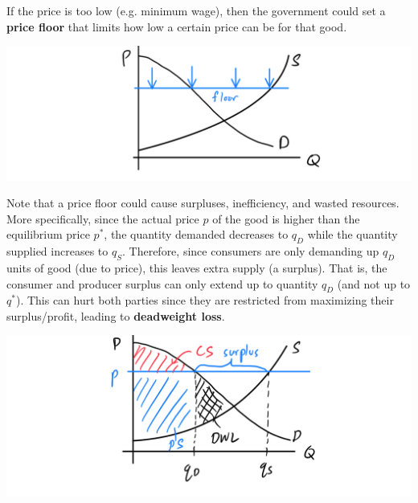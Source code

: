 \documentclass{article}
\begin{document}
    \begin{definition}
      If the price is too low (e.g. minimum wage), then the government could set a \textbf{price floor} that limits how low a certain price can be for that good. 
      \begin{center}
        \includegraphics[scale=0.25]{img/Price_Floor.PNG}
      \end{center}
      Note that a price floor could cause surpluses, inefficiency, and wasted resources. More specifically, since the actual price $p$ of the good is higher than the equilibrium price $p^*$, the quantity demanded decreases to $q_D$ while the quantity supplied increases to $q_S$. Therefore, since consumers are only demanding up $q_D$ units of good (due to price), this leaves extra supply (a surplus). That is, the consumer and producer surplus can only extend up to quantity $q_D$ (and not up to $q^*$). This can hurt both parties since they are restricted from maximizing their surplus/profit, leading to \textbf{deadweight loss}. 
      \begin{center}
        \includegraphics[scale=0.25]{img/Price_Floor_DWL.PNG}
      \end{center}
    \end{definition}
\end{document}
